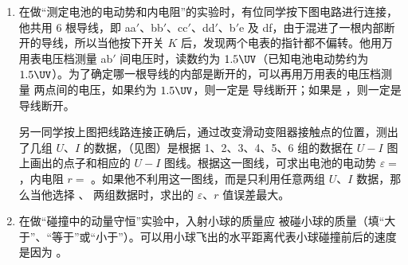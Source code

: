 \documentclass[\gkver]{gaokaozhenti}
\begin{document}
\begin{enumerate}
\item
在做“测定电池的电动势和内电阻”的实验时，有位同学按下图电路进行连接，他共用 6 根导线，即 aa$'$、bb$'$、cc$'$、dd$'$、b$'$e 及 df，由于混进了一根内部断开的导线，所以当他按下开关 $K$ 后，发现两个电表的指针都不偏转。他用万用表电压档测量 ab$'$ 间电压时，读数约为 $1.5\UV$（已知电池电动势约为 $1.5\UV$）。为了确定哪一根导线的内部是断开的，可以再用万用表的电压档测量  两点间的电压，如果约为 $1.5\UV$，则一定是  导线断开；如果是 \tkanswer{$0\UV$}，则一定是  导线断开。

另一同学按上图把线路连接正确后，通过改变滑动变阻器接触点的位置，测出了几组 $U$、$I$ 的数据，（见图）是根据 1、2、3、4、5、6 组的数据在 $U-I$ 图上画出的点子和相应的 $U-I$ 图线。根据这一图线，可求出电池的电动势 $\varepsilon =$ \tkanswer{$1.43\UV$}，内电阻 $r =$ \tkanswer{$0.98\UO$}。如果他不利用这一图线，而是只利用任意两组 $U$、$I$ 数据，那么当他选择 、 两组数据时，求出的 $\varepsilon$、$r$ 值误差最大。
\twopicture[labelA=1988上海21a, labelB=1988上海21b, align=right, wA=5.37cm, wB=9.09cm]
{}
{}

\item
在做“碰撞中的动量守恒”实验中，入射小球的质量应  被碰小球的质量（填“大于”、“等于”或“小于”）。可以用小球飞出的水平距离代表小球碰撞前后的速度是因为 。
\end{enumerate}
\end{document}

